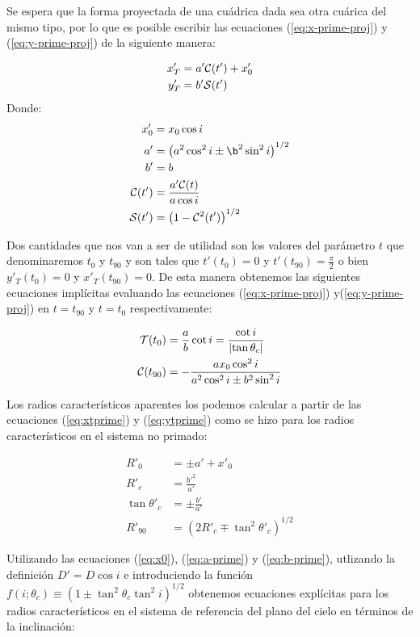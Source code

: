 Se espera que la forma proyectada de una cuádrica dada sea otra cuárica del mismo
tipo, por lo que es posible escribir las ecuaciones (\ref{eq:x-prime-proj}) y
(\ref{eq:y-prime-proj}) de la siguiente manera: 

\begin{align}
  x'_T &= a'\mathcal{C}(t') + x'_0 \label{eq:xtprime}\\
  y'_T &= b'\mathcal{S}(t') \label{eq:ytprime}
\end{align}
Donde:
\begin{align}
  x'_0 &= x_0\cos i \\
  a' &= \left(a^2\cos^2 i \pm \b^2\sin^2 i\right)^{1/2} \label{eq:a-prime}\\
  b' &= b \label{eq:b-prime}\\
  \Cos(t') &= \frac{a'\Cos(t)}{a\cos i} \\
  \Sin(t') &= \left(1 - \Cos^2(t')\right)^{1/2}
\end{align}

Dos cantidades que nos van a ser de utilidad son los valores del parámetro $t$
que denominaremos $t_0$ y $t_{90}$ y son tales que $t'(t_0) = 0$ y $t'(t_{90}) = \frac{\pi}{2}$
o bien $y'_T(t_0) = 0$ y $x'_T(t_{90}) = 0$. De esta manera obtenemos las siguientes ecuaciones
implícitas evaluando las ecuaciones (\ref{eq:x-prime-proj}) y(\ref{eq:y-prime-proj}) en $t=t_{90}$
y $t=t_0$ respectivamente:

\begin{align}
  \mathcal{T}(t_0) &= \frac{a}{b}\cot{i} = \frac{\cot{i}}{\left|\tan\theta_c\right|} \label{eq:t0}\\
  \mathcal{C}(t_{90}) &= -\frac{ax_0\cos^2{i}}{a^2\cos^2{i}\pm b^2\sin^2{i}} \label{eq:t90}
\end{align}

Los radios característicos aparentes los podemos calcular a partir de las ecuaciones (\ref{eq:xtprime}) y
(\ref{eq:ytprime}) como se hizo para los radios característicos en el sistema no primado:

\begin{align}
  R'_0 &= \pm a' + x'_0\\
  R'_c &= \frac{b'^2}{a'}\\
  \tan\theta'_c &= \pm\frac{b'}{a'} \\
  R'_{90} &= \left(2R'_c \mp \tan^2\theta'_c\right)^{1/2}
\end{align}

Utilizando las ecuaciones (\ref{eq:x0}), (\ref{eq:a-prime}) y (\ref{eq:b-prime}),
utlizando la definición $D' = D\cos i$ e introduciendo la función
$f(i;\theta_c)\equiv \left(1 \pm \tan^2\theta_c\tan^2i\right)^{1/2}$ obtenemos
ecuaciones explícitas para los radios característicos en el sistema de referencia
del plano del cielo en términos de la inclinación:

